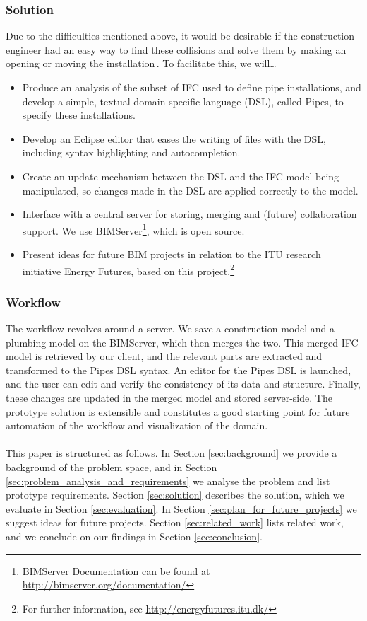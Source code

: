 \subsubsection{Solution}
Due to the difficulties mentioned above, it would be desirable if the construction engineer had an easy way to find these collisions and solve them by making an opening or moving the installation\,\cite{jorgensen12}. To facilitate this, we will…
\begin{itemize}
\item Produce an analysis of the subset of IFC used to define pipe installations, and develop a simple, textual domain specific language (DSL), called Pipes, to specify these installations.
\item Develop an Eclipse editor that eases the writing of files with the DSL, including syntax highlighting and autocompletion.
\item Create an update mechanism between the DSL and the IFC model being manipulated, so changes made in the DSL are applied correctly to the model.
\item Interface with a central server for storing, merging and (future) collaboration support. We use BIMServer\footnote{BIMServer Documentation can be found at \url{http://bimserver.org/documentation/}}, which is open source.
\item Present ideas for future BIM projects in relation to the ITU research initiative Energy Futures, based on this project.\footnote{For further information, see \url{http://energyfutures.itu.dk/}}
\end{itemize}

\subsubsection{Workflow}
\label{sec:workflow}
The workflow revolves around a server. We save a construction model and a plumbing model on the BIMServer, which then merges the two. This merged IFC model is retrieved by our client, and the relevant parts are extracted and transformed to the Pipes DSL syntax. An editor for the Pipes DSL is launched, and the user can edit and verify the consistency of its data and structure. Finally, these changes are updated in the merged model and stored server-side. The prototype solution is extensible and constitutes a good starting point for future automation of the workflow and visualization of the domain.

\paragraph{}
This paper is structured as follows. In Section \ref{sec:background} we provide a background of the problem space, and in Section \ref{sec:problem_analysis_and_requirements} we analyse the problem and list prototype requirements. Section \ref{sec:solution} describes the solution, which we evaluate in Section \ref{sec:evaluation}. In Section \ref{sec:plan_for_future_projects} we suggest ideas for future projects. Section \ref{sec:related_work} lists related work, and we conclude on our findings in Section \ref{sec:conclusion}.
